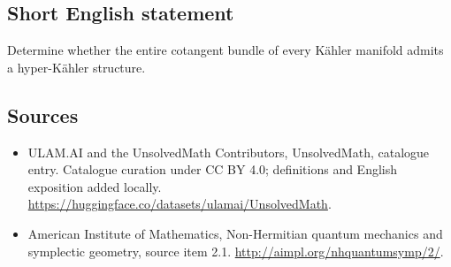 \documentclass[11pt]{article}
\begin{document}
\subsection{Short English statement}
Determine whether the entire cotangent bundle of every Kähler manifold admits a hyper-Kähler structure.
\subsection{Sources}
\begin{itemize}
\item[\hypertarget{source:statement:1}{S1}] ULAM.AI and the UnsolvedMath Contributors, UnsolvedMath, catalogue entry. Catalogue curation under CC BY 4.0; definitions and English exposition added locally.
\url{https://huggingface.co/datasets/ulamai/UnsolvedMath}.
\item[\hypertarget{source:statement:2}{S2}] American Institute of Mathematics, Non-Hermitian quantum mechanics and symplectic geometry, source item 2.1.
\url{http://aimpl.org/nhquantumsymp/2/}.
\end{itemize}
\label{end:statement}
\end{document}

